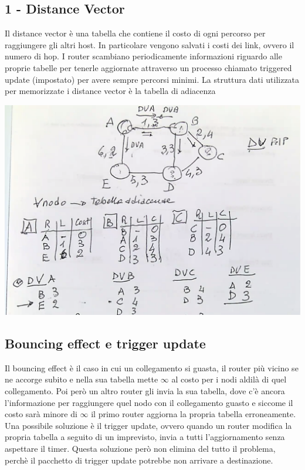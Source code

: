 \documentclass[11pt, oneside]{article}   	%
\begin{document}
\subsection*{1 - Distance Vector}
Il distance vector è una tabella che contiene il costo di ogni percorso per raggiungere gli altri host. In particolare vengono salvati i costi dei link, ovvero il numero di hop. I router scambiano periodicamente informazioni riguardo alle proprie tabelle per tenerle aggiornate attraverso un processo chiamato triggered update (impostato) per avere sempre percorsi minimi. La struttura dati utilizzata per memorizzate i distance vector è la tabella di adiacenza
\begin{center}
\includegraphics[scale=0.5]{dvector}
\end{center}
\subsection*{Bouncing effect e trigger update}
Il bouncing effect è il caso in cui un collegamento si guasta, il router più vicino se ne accorge subito e nella sua tabella mette $\infty$ al costo per i nodi aldilà di quel collegamento. Poi però un altro router gli invia la sua tabella, dove c'è ancora l'informazione per raggiungere quel nodo con il collegamento guasto e siccome il costo sarà minore di $\infty$ il primo router aggiorna la propria tabella erroneamente.\\
Una possibile soluzione è il trigger update, ovvero quando un router modifica la propria tabella a seguito di un imprevisto, invia a tutti l'aggiornamento senza aspettare il timer. Questa soluzione però non elimina del tutto il problema, perchè il pacchetto di trigger update potrebbe non arrivare a destinazione.
\end{document}
